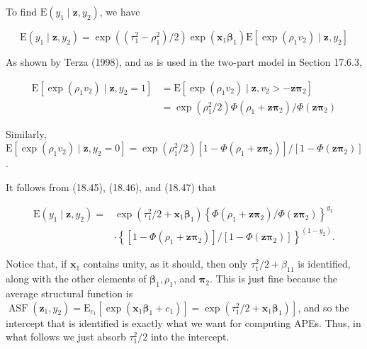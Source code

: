 \documentclass[10pt]{article}
\begin{document}
To find $\mathrm{E}\left(y_{1} \mid \mathbf{z}, y_{2}\right)$, we have


\begin{equation*}
\mathrm{E}\left(y_{1} \mid \mathbf{z}, y_{2}\right)=\exp \left(\left(\tau_{1}^{2}-\rho_{1}^{2}\right) / 2\right) \exp \left(\mathbf{x}_{1} \boldsymbol{\beta}_{1}\right) \mathrm{E}\left[\exp \left(\rho_{1} v_{2}\right) \mid \mathbf{z}, y_{2}\right] \tag{18.45}
\end{equation*}


As shown by Terza (1998), and as is used in the two-part model in Section 17.6.3,


\begin{align*}
\mathrm{E}\left[\exp \left(\rho_{1} v_{2}\right) \mid \mathbf{z}, y_{2}=1\right] & =\mathrm{E}\left[\exp \left(\rho_{1} v_{2}\right) \mid \mathbf{z}, v_{2}>-\mathbf{z} \boldsymbol{\pi}_{2}\right] \\
& =\exp \left(\rho_{1}^{2} / 2\right) \Phi\left(\rho_{1}+\mathbf{z} \boldsymbol{\pi}_{2}\right) / \Phi\left(\mathbf{z} \boldsymbol{\pi}_{2}\right) \tag{18.46}
\end{align*}


Similarly,\\
$\mathrm{E}\left[\exp \left(\rho_{1} v_{2}\right) \mid \mathbf{z}, y_{2}=0\right]=\exp \left(\rho_{1}^{2} / 2\right)\left[1-\Phi\left(\rho_{1}+\mathbf{z} \boldsymbol{\pi}_{2}\right)\right] /\left[1-\Phi\left(\mathbf{z} \boldsymbol{\pi}_{2}\right)\right]$.

It follows from (18.45), (18.46), and (18.47) that


\begin{align*}
\mathrm{E}\left(y_{1} \mid \mathbf{z}, y_{2}\right)= & \exp \left(\tau_{1}^{2} / 2+\mathbf{x}_{1} \boldsymbol{\beta}_{1}\right)\left\{\Phi\left(\rho_{1}+\mathbf{z} \boldsymbol{\pi}_{2}\right) / \Phi\left(\mathbf{z} \boldsymbol{\pi}_{2}\right)\right\}^{y_{2}} \\
& \cdot\left\{\left[1-\Phi\left(\rho_{1}+\mathbf{z} \boldsymbol{\pi}_{2}\right)\right] /\left[1-\Phi\left(\mathbf{z} \boldsymbol{\pi}_{2}\right)\right]\right\}^{\left(1-y_{2}\right)} . \tag{18.48}
\end{align*}


Notice that, if $\mathbf{x}_{1}$ contains unity, as it should, then only $\tau_{1}^{2} / 2+\beta_{11}$ is identified, along with the other elements of $\boldsymbol{\beta}_{1}, \rho_{1}$, and $\boldsymbol{\pi}_{2}$. This is just fine because the average structural function is $\left.\operatorname{ASF}\left(\mathbf{z}_{1}, y_{2}\right)=\mathrm{E}_{c_{1}}\left[\exp \left(\mathbf{x}_{1} \boldsymbol{\beta}_{1}+c_{1}\right)\right]=\exp \left(\tau_{1}^{2} / 2+\mathbf{x}_{1} \boldsymbol{\beta}_{1}\right)\right]$, and so the intercept that is identified is exactly what we want for computing APEs. Thus, in what follows we just absorb $\tau_{1}^{2} / 2$ into the intercept.
\end{document}
